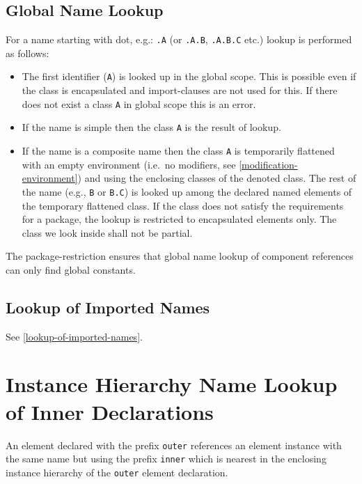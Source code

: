 \subsection{Global Name Lookup}\label{global-name-lookup}

For a name starting with dot, e.g.: \lstinline!.A! (or \lstinline!.A.B!, \lstinline!.A.B.C! etc.) lookup is performed as follows:
\begin{itemize}
\item
  The first identifier (\lstinline!A!) is looked up in the global scope.
  This is possible even if the class is encapsulated and import-clauses are not used for this.
  If there does not exist a class \lstinline!A! in global scope this is an error.
\item
  If the name is simple then the class \lstinline!A! is the result of lookup.
\item
  If the name is a composite name then the class \lstinline!A! is temporarily
  flattened with an empty environment (i.e.\ no modifiers, see
  \cref{modification-environment}) and using the enclosing classes of the denoted class. The rest
  of the name (e.g., \lstinline!B! or \lstinline!B.C!) is looked up among the declared named
  elements of the temporary flattened class. If the class does not
  satisfy the requirements for a package, the lookup is restricted to
  encapsulated elements only. The class we look inside shall not be
  partial.
\end{itemize}

\begin{nonnormative}
The package-restriction ensures that global name lookup of
component references can only find global constants.
\end{nonnormative}

\subsection{Lookup of Imported Names}\label{lookup-of-imported-names1}

See \cref{lookup-of-imported-names}.

\section{Instance Hierarchy Name Lookup of Inner Declarations}\label{instance-hierarchy-name-lookup-of-inner-declarations}

An element declared with the prefix \lstinline!outer! references an element instance with the same name but using the prefix \lstinline!inner! which is nearest in the enclosing instance hierarchy of the \lstinline!outer! element declaration.

